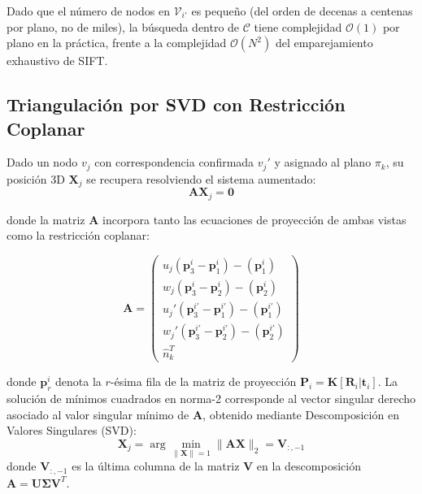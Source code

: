 Dado que el número de nodos en $\mathcal{V}_{i'}$ es pequeño (del orden de decenas a centenas por plano, no de miles), la búsqueda dentro de $\mathcal{C}$ tiene complejidad $\mathcal{O}(1)$ por plano en la práctica, frente a la complejidad $\mathcal{O}(N^2)$ del emparejamiento exhaustivo de SIFT.
 
\subsection{Triangulación por SVD con Restricción Coplanar}
 
Dado un nodo $v_j$ con correspondencia confirmada $v_j'$ y asignado al plano $\pi_k$, su posición 3D $\mathbf{X}_j$ se recupera resolviendo el sistema aumentado:
\begin{equation}
    \mathbf{A} \mathbf{X}_j = \mathbf{0}
\end{equation}
 
donde la matriz $\mathbf{A}$ incorpora tanto las ecuaciones de proyección de ambas vistas como la restricción coplanar:
 
\begin{equation}
    \mathbf{A} = \begin{pmatrix}
        u_j (\mathbf{p}_3^i - \mathbf{p}_1^i) - (\mathbf{p}_1^i) \\
        w_j (\mathbf{p}_3^i - \mathbf{p}_2^i) - (\mathbf{p}_2^i) \\
        u_j' (\mathbf{p}_3^{i'} - \mathbf{p}_1^{i'}) - (\mathbf{p}_1^{i'}) \\
        w_j' (\mathbf{p}_3^{i'} - \mathbf{p}_2^{i'}) - (\mathbf{p}_2^{i'}) \\
        \hat{n}_k^T
    \end{pmatrix}
\end{equation}
 
donde $\mathbf{p}_r^i$ denota la $r$-ésima fila de la matriz de proyección $\mathbf{P}_i = \mathbf{K}[\mathbf{R}_i | \mathbf{t}_i]$. La solución de mínimos cuadrados en norma-2 corresponde al vector singular derecho asociado al valor singular mínimo de $\mathbf{A}$, obtenido mediante Descomposición en Valores Singulares (SVD):
\begin{equation}
    \mathbf{X}_j = \arg\min_{\|\mathbf{X}\|=1} \|\mathbf{A}\mathbf{X}\|_2 = \mathbf{V}_{:, -1}
\end{equation}
donde $\mathbf{V}_{:,-1}$ es la última columna de la matriz $\mathbf{V}$ en la descomposición $\mathbf{A} = \mathbf{U}\boldsymbol{\Sigma}\mathbf{V}^T$.
 
